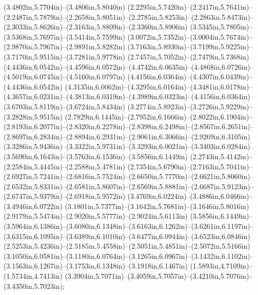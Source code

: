 (3.4802in,5.7704in)--(3.4806in,5.8040in) (2.2295in,5.7420in)--(2.2417in,5.7641in)--(2.2487in,5.7879in)--(2.2658in,5.8051in)--(2.2785in,5.8253in)--(2.2863in,5.8473in)--(2.3033in,5.8626in)--(2.3163in,5.8809in)--(2.3360in,5.8906in) (3.5345in,5.7805in)--(3.5368in,5.7697in)--(3.5414in,5.7599in) (3.0072in,5.7352in)--(3.0004in,5.7674in)--(2.9870in,5.7967in)--(2.9891in,5.8282in) (3.7163in,5.8930in)--(3.7199in,5.9225in)--(3.7170in,5.9515in)--(3.7281in,5.9778in) (2.7457in,5.7052in)--(2.7479in,5.7368in) (4.4436in,6.0542in)--(4.4596in,6.0572in)--(4.4742in,6.0635in)--(4.4868in,6.0726in)--(4.5019in,6.0745in)--(4.5160in,6.0797in) (4.4156in,6.0364in)--(4.4307in,6.0439in)--(4.4436in,6.0542in) (4.3135in,6.0062in)--(4.3295in,6.0164in)--(4.3481in,6.0178in)--(4.3657in,6.0231in)--(4.3813in,6.0319in)--(4.3989in,6.0323in)--(4.4156in,6.0364in) (3.6703in,5.8119in)--(3.6724in,5.8434in) (3.2774in,5.8923in)--(3.2726in,5.9229in)--(3.2828in,5.9515in) (2.7829in,6.1445in)--(2.7952in,6.1666in)--(2.8022in,6.1904in)--(2.8193in,6.2077in)--(2.8320in,6.2278in)--(2.8398in,6.2498in)--(2.8567in,6.2651in)--(2.8697in,6.2834in)--(2.8894in,6.2931in)--(2.9061in,6.3066in)--(2.9269in,6.3105in) (3.3286in,5.9436in)--(3.3322in,5.9731in)--(3.3293in,6.0021in)--(3.3403in,6.0284in) (3.5690in,6.1643in)--(3.5763in,6.1536in)--(3.5856in,6.1449in) (2.2743in,5.4142in)--(2.2584in,5.4445in)--(2.2588in,5.4781in) (2.7354in,5.6790in)--(2.7163in,5.7041in)--(2.6927in,5.7241in)--(2.6816in,5.7524in)--(2.6650in,5.7770in)--(2.6621in,5.8060in)--(2.6532in,5.8331in)--(2.6581in,5.8607in)--(2.6569in,5.8881in)--(2.6687in,5.9123in)--(2.6747in,5.9379in)--(2.6918in,5.9572in) (3.4769in,6.0224in)--(3.4886in,6.0466in)--(3.4946in,6.0722in) (3.1801in,5.7377in)--(3.1642in,5.7681in)--(3.1646in,5.8016in) (2.9179in,5.5474in)--(2.9020in,5.5777in)--(2.9024in,5.6113in) (3.5856in,6.1449in)--(3.5964in,6.1386in)--(3.6080in,6.1348in)--(3.6163in,6.1262in)--(3.6261in,6.1197in)--(3.6315in,6.1095in)--(3.6389in,6.1010in)--(3.6477in,6.0944in)--(3.6523in,6.0846in) (2.5253in,5.4236in)--(2.5185in,5.4558in)--(2.5051in,5.4851in)--(2.5072in,5.5166in) (3.1050in,6.0581in)--(3.1180in,6.0764in)--(3.1265in,6.0967in)--(3.1432in,6.1102in)--(3.1563in,6.1267in)--(3.1753in,6.1348in)--(3.1918in,6.1467in) (1.5893in,4.7109in)--(1.5734in,4.7413in) (3.3904in,5.7071in)--(3.4059in,5.7057in)--(3.4210in,5.7076in)--(3.4350in,5.7023in);
